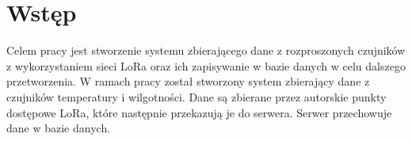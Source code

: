 
\chapter*{Wstęp} %

Celem pracy jest stworzenie systemu zbierającego dane z rozproszonych czujników z wykorzystaniem sieci LoRa oraz ich zapisywanie w bazie danych w celu dalszego przetworzenia. W ramach pracy został stworzony system zbierający dane z czujników temperatury i wilgotności. Dane są zbierane przez autorskie punkty dostępowe LoRa, które następnie przekazują je do serwera. Serwer przechowuje dane w bazie danych.
